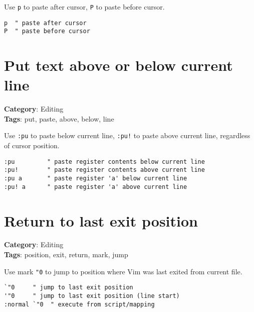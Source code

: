{{{{Use {\footnotesize \Verb§p§} to paste after cursor, {\footnotesize \Verb§P§} to paste before cursor.

\begin{Exa*}{}
\begin{Verbatim}[fontsize=\footnotesize, breaklines, breakanywhere]
p  " paste after cursor
P  " paste before cursor
\end{Verbatim}
\end{Exa*}

\section{Put text above or below current line}

\textbf{Category}: Editing\\ \textbf{Tags}: put, paste, above, below, line
\vspace{0.5cm}

Use {\footnotesize \Verb§:pu§} to paste below current line, {\footnotesize \Verb§:pu!§} to paste above current line, regardless of cursor position.

\begin{Exa*}{}
\begin{Verbatim}[fontsize=\footnotesize, breaklines, breakanywhere]
:pu         " paste register contents below current line
:pu!        " paste register contents above current line
:pu a       " paste register 'a' below current line
:pu! a      " paste register 'a' above current line
\end{Verbatim}
\end{Exa*}

\section{Return to last exit position}

\textbf{Category}: Editing\\ \textbf{Tags}: position, exit, return, mark, jump
\vspace{0.5cm}

Use mark {\footnotesize \Verb§"0§} to jump to position where Vim was last exited from current file.

\begin{Exa*}{}
\begin{Verbatim}[fontsize=\footnotesize, breaklines, breakanywhere]
`"0     " jump to last exit position
'"0     " jump to last exit position (line start)
:normal `"0  " execute from script/mapping
\end{Verbatim}
\end{Exa*}

}}}}
